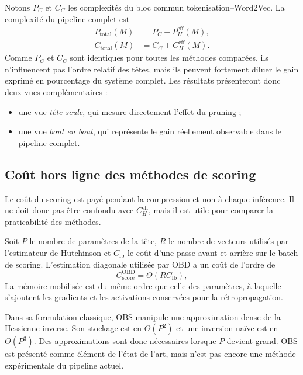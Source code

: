 Notons $P_C$ et $C_C$ les complexités du bloc commun tokenisation--Word2Vec.
La complexité du pipeline complet est
\begin{align}
    P_{\mathrm{total}}(M)&=P_C+P_H^{\mathrm{eff}}(M),\\
    C_{\mathrm{total}}(M)&=C_C+C_H^{\mathrm{eff}}(M).
\end{align}
Comme $P_C$ et $C_C$ sont identiques pour toutes les méthodes comparées, ils
n'influencent pas l'ordre relatif des têtes, mais ils peuvent fortement diluer
le gain exprimé en pourcentage du système complet. Les résultats présenteront
donc deux vues complémentaires :
\begin{itemize}
    \item une vue \emph{tête seule}, qui mesure directement l'effet du pruning ;
    \item une vue \emph{bout en bout}, qui représente le gain réellement
    observable dans le pipeline complet.
\end{itemize}

\subsection{Coût hors ligne des méthodes de scoring}
\label{ssec:probleme_cout_scoring}

Le coût du scoring est payé pendant la compression et non à chaque inférence.
Il ne doit donc pas être confondu avec $C_H^{\mathrm{eff}}$, mais il est utile
pour comparer la praticabilité des méthodes.

Soit $P$ le nombre de paramètres de la tête, $R$ le nombre de vecteurs utilisés
par l'estimateur de Hutchinson et $C_{\mathrm{fb}}$ le coût d'une passe avant et
arrière sur le batch de scoring. L'estimation diagonale utilisée par OBD a un
coût de l'ordre de
\begin{equation}
    C_{\mathrm{score}}^{\mathrm{OBD}}
    =\Theta\!\left(RC_{\mathrm{fb}}\right),
\end{equation}
La mémoire mobilisée est du même ordre que celle des paramètres, à laquelle
s'ajoutent les gradients et les activations conservées pour la
rétropropagation.

Dans sa formulation classique, OBS manipule une approximation dense de la
Hessienne inverse. Son stockage est en $\Theta(P^2)$ et une inversion naïve est
en $\Theta(P^3)$. Des approximations sont donc nécessaires lorsque $P$ devient
grand. OBS est présenté comme élément de l'état de l'art, mais n'est pas encore
une méthode expérimentale du pipeline actuel.

